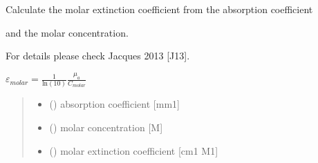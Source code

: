 \documentclass[letterpaper,10pt,english]{sphinxmanual}
\begin{document}

\begin{fulllineitems}
\label{\detokenize{03_absorption_coefficient:skinoptics.absorption_coefficient.molarext_from_mua_Cmolar}}
\pysigstartsignatures
{}
\pysigstopsignatures
\begin{DUlineblock}{0em}
\item[] Calculate the molar extinction coefficient from the absorption coefficient
\item[] and the molar concentration.
\item[] For details please check Jacques 2013 {[}J13{]}.
\end{DUlineblock}

\sphinxAtStartPar
\(\varepsilon_{molar} = \frac{1}{\mbox{ln}(10)}\frac{\mu_a}{C_{molar}}\)
\begin{quote}\begin{description}
\begin{itemize}
\item {} 
\sphinxAtStartPar
{} () \textendash{} absorption coefficient {[}mm\sphinxhyphen{}1{]}

\item {} 
\sphinxAtStartPar
{} () \textendash{} molar concentration {[}M{]}

\end{itemize}

\sphinxAtStartPar
\begin{itemize}
\item {} 
\sphinxAtStartPar
{} () \textendash{} molar extinction coefficient {[}cm\sphinxhyphen{}1 M\sphinxhyphen{}1{]}

\end{itemize}


\end{description}\end{quote}

\end{fulllineitems}
\end{document}
